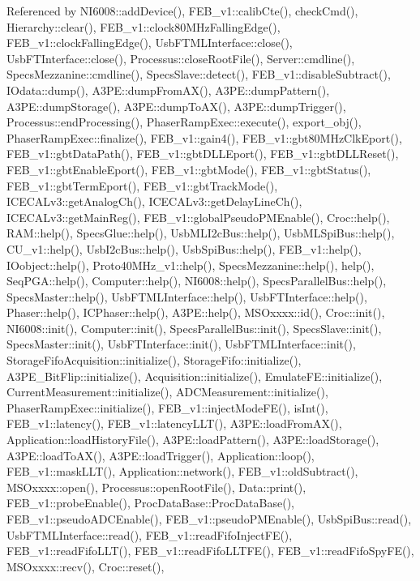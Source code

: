 Referenced by N\+I6008\+::add\+Device(), F\+E\+B\+\_\+v1\+::calib\+Cte(), check\+Cmd(), Hierarchy\+::clear(), F\+E\+B\+\_\+v1\+::clock80\+M\+Hz\+Falling\+Edge(), F\+E\+B\+\_\+v1\+::clock\+Falling\+Edge(), Usb\+F\+T\+M\+L\+Interface\+::close(), Usb\+F\+T\+Interface\+::close(), Processus\+::close\+Root\+File(), Server\+::cmdline(), Specs\+Mezzanine\+::cmdline(), Specs\+Slave\+::detect(), F\+E\+B\+\_\+v1\+::disable\+Subtract(), I\+Odata\+::dump(), A3\+P\+E\+::dump\+From\+A\+X(), A3\+P\+E\+::dump\+Pattern(), A3\+P\+E\+::dump\+Storage(), A3\+P\+E\+::dump\+To\+A\+X(), A3\+P\+E\+::dump\+Trigger(), Processus\+::end\+Processing(), Phaser\+Ramp\+Exec\+::execute(), export\+\_\+obj(), Phaser\+Ramp\+Exec\+::finalize(), F\+E\+B\+\_\+v1\+::gain4(), F\+E\+B\+\_\+v1\+::gbt80\+M\+Hz\+Clk\+Eport(), F\+E\+B\+\_\+v1\+::gbt\+Data\+Path(), F\+E\+B\+\_\+v1\+::gbt\+D\+L\+L\+Eport(), F\+E\+B\+\_\+v1\+::gbt\+D\+L\+L\+Reset(), F\+E\+B\+\_\+v1\+::gbt\+Enable\+Eport(), F\+E\+B\+\_\+v1\+::gbt\+Mode(), F\+E\+B\+\_\+v1\+::gbt\+Status(), F\+E\+B\+\_\+v1\+::gbt\+Term\+Eport(), F\+E\+B\+\_\+v1\+::gbt\+Track\+Mode(), I\+C\+E\+C\+A\+Lv3\+::get\+Analog\+Ch(), I\+C\+E\+C\+A\+Lv3\+::get\+Delay\+Line\+Ch(), I\+C\+E\+C\+A\+Lv3\+::get\+Main\+Reg(), F\+E\+B\+\_\+v1\+::global\+Pseudo\+P\+M\+Enable(), Croc\+::help(), R\+A\+M\+::help(), Specs\+Glue\+::help(), Usb\+M\+L\+I2c\+Bus\+::help(), Usb\+M\+L\+Spi\+Bus\+::help(), C\+U\+\_\+v1\+::help(), Usb\+I2c\+Bus\+::help(), Usb\+Spi\+Bus\+::help(), F\+E\+B\+\_\+v1\+::help(), I\+Oobject\+::help(), Proto40\+M\+Hz\+\_\+v1\+::help(), Specs\+Mezzanine\+::help(), help(), Seq\+P\+G\+A\+::help(), Computer\+::help(), N\+I6008\+::help(), Specs\+Parallel\+Bus\+::help(), Specs\+Master\+::help(), Usb\+F\+T\+M\+L\+Interface\+::help(), Usb\+F\+T\+Interface\+::help(), Phaser\+::help(), I\+C\+Phaser\+::help(), A3\+P\+E\+::help(), M\+S\+Oxxxx\+::id(), Croc\+::init(), N\+I6008\+::init(), Computer\+::init(), Specs\+Parallel\+Bus\+::init(), Specs\+Slave\+::init(), Specs\+Master\+::init(), Usb\+F\+T\+Interface\+::init(), Usb\+F\+T\+M\+L\+Interface\+::init(), Storage\+Fifo\+Acquisition\+::initialize(), Storage\+Fifo\+::initialize(), A3\+P\+E\+\_\+\+Bit\+Flip\+::initialize(), Acquisition\+::initialize(), Emulate\+F\+E\+::initialize(), Current\+Measurement\+::initialize(), A\+D\+C\+Measurement\+::initialize(), Phaser\+Ramp\+Exec\+::initialize(), F\+E\+B\+\_\+v1\+::inject\+Mode\+F\+E(), is\+Int(), F\+E\+B\+\_\+v1\+::latency(), F\+E\+B\+\_\+v1\+::latency\+L\+L\+T(), A3\+P\+E\+::load\+From\+A\+X(), Application\+::load\+History\+File(), A3\+P\+E\+::load\+Pattern(), A3\+P\+E\+::load\+Storage(), A3\+P\+E\+::load\+To\+A\+X(), A3\+P\+E\+::load\+Trigger(), Application\+::loop(), F\+E\+B\+\_\+v1\+::mask\+L\+L\+T(), Application\+::network(), F\+E\+B\+\_\+v1\+::old\+Subtract(), M\+S\+Oxxxx\+::open(), Processus\+::open\+Root\+File(), Data\+::print(), F\+E\+B\+\_\+v1\+::probe\+Enable(), Proc\+Data\+Base\+::\+Proc\+Data\+Base(), F\+E\+B\+\_\+v1\+::pseudo\+A\+D\+C\+Enable(), F\+E\+B\+\_\+v1\+::pseudo\+P\+M\+Enable(), Usb\+Spi\+Bus\+::read(), Usb\+F\+T\+M\+L\+Interface\+::read(), F\+E\+B\+\_\+v1\+::read\+Fifo\+Inject\+F\+E(), F\+E\+B\+\_\+v1\+::read\+Fifo\+L\+L\+T(), F\+E\+B\+\_\+v1\+::read\+Fifo\+L\+L\+T\+F\+E(), F\+E\+B\+\_\+v1\+::read\+Fifo\+Spy\+F\+E(), M\+S\+Oxxxx\+::recv(), Croc\+::reset(), 